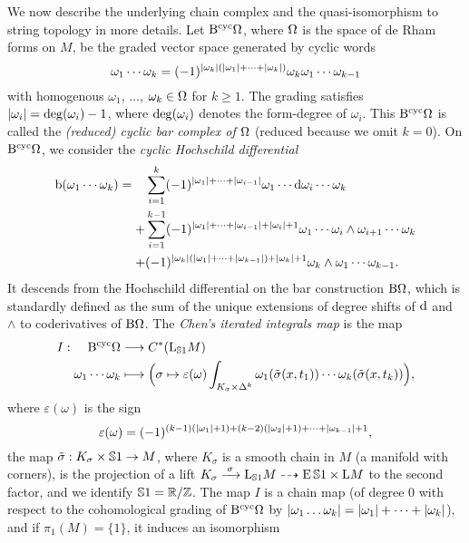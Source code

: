 \documentclass[\MainFolder/Text.tex]{subfiles}
\begin{document}
We now describe the underlying chain complex and the quasi-isomorphism to string topology in more details. Let $\mathrm{B}^{\mathrm{cyc}} \Omega$, where $\Omega$ is the space of de Rham forms on $M$, be the graded vector space generated by cyclic words 
\[ \omega_1\dotsb\omega_k = (-1)^{|\omega_k|(|\omega_1|+\dotsb+|\omega_k|)} \omega_k\omega_1 \dotsb \omega_{k-1} \]
with homogenous $\omega_1$, $\dotsc$, $\omega_k \in \Omega$ for $k\ge 1$. The grading satisfies $|\omega_i| = \operatorname{deg}(\omega_i) - 1$, where $\operatorname{deg}(\omega_i)$ denotes the form-degree of $\omega_i$. This $\mathrm{B}^{\mathrm{cyc}} \Omega$ is called the \emph{(reduced) cyclic bar complex of $\Omega$} (reduced because we omit $k=0$). On $\mathrm{B}^{\mathrm{cyc}} \Omega$, we consider the \emph{cyclic Hochschild differential}
\[ \mathrm{b}(\omega_1 \dotsb \omega_k) = \begin{aligned}[t]
&\sum_{i=1}^k (-1)^{|\omega_1| + \dotsb + |\omega_{i-1}|}\omega_1 \dotsb\mathrm{d}\omega_i\dotsb \omega_k \\
+&\sum_{i=1}^{k-1} (-1)^{|\omega_1|+\dotsb + |\omega_{i-1}| + |\omega_i| + 1}\omega_1 \dotsb \omega_i \wedge \omega_{i+1} \dotsb \omega_k\\
+&(-1)^{|\omega_k|(|\omega_1| + \dotsb + |\omega_{k-1}|) + |\omega_k| + 1}\omega_k \wedge \omega_1 \dotsb \omega_{k-1}.
\end{aligned}\]
It descends from the Hochschild differential on the bar construction $\mathrm{B} \Omega$, which is standardly defined as the sum of the unique extensions of degree shifts of $\mathrm{d}$ and $\wedge$ to coderivatives of $\mathrm{B} \Omega$. The \emph{Chen's iterated integrals map} is the map
\[ I: \begin{aligned}[t]
    \mathrm{B}^{\mathrm{cyc}} \Omega& \longrightarrow C^*(\mathrm{L}_{\mathbb{S}{1}} M)\\    
    \omega_1 \dotsb \omega_k & \longmapsto  \Bigl(\sigma \mapsto \varepsilon(\omega) \int_{K_\sigma \times \Delta^k} \omega_1(\tilde{\sigma}(x,t_1)) \dotsb \omega_k(\tilde{\sigma}(x,t_k))\Bigr),
   \end{aligned}\]
where $\varepsilon(\omega)$ is the sign
\[ \varepsilon(\omega) = (-1)^{(k-1)(|\omega_1| + 1) + (k-2)(|\omega_2| + 1) + \dotsb + |\omega_{k-1}| + 1}, \]
the map $\tilde{\sigma}: K_\sigma\times\mathbb{S}{1} \rightarrow M$, where $K_\sigma$ is a smooth chain in $M$ (a manifold with corners), is the projection of a lift $K_\sigma \xrightarrow{\hspace{.2em}\sigma\hspace{.2em}}\mathrm{L}_{\mathbb{S}{1}} M \dasharrow \operatorname{E} \mathbb{S}{1} \times \mathrm{L} M$ to the second factor, and we identify $\mathbb{S}{1} = \mathbb{R}/\mathbb{Z}$. The map $I$ is a chain map (of degree $0$ with respect to the cohomological grading of $\mathrm{B}^{\mathrm{cyc}}\Omega$ by $|\omega_1 \dotsc \omega_k| = |\omega_1| + \dotsb + |\omega_k|$), and if $\pi_1(M) = \{1\}$, it induces an isomorphism 
\end{document}

